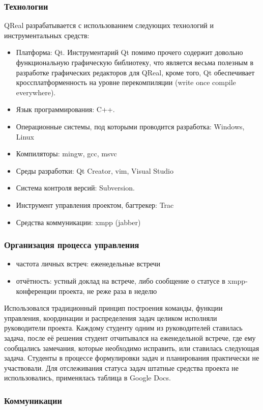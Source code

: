 \documentclass[a5paper]{article}
\begin{document}
\subsubsection{Технологии}
QReal разрабатывается с использованием следующих технологий и инструментальных средств:
\begin{itemize}
	\item Платформа: Qt. Инструментарий Qt помимо прочего содержит довольно функциональную графическую библиотеку, что является весьма полезным в разработке графических редакторов для QReal, кроме того, Qt обеспечивает кроссплатформенность на уровне перекомпиляции (write once compile everywhere).
	\item Язык программирования: C++.
	\item Операционные системы, под которыми проводится разработка: Windows, Linux
	\item Компиляторы: mingw, gcc, msvc
	\item Среды разработки: Qt Creator, vim, Visual Studio
	\item Система контроля версий: Subversion.
	\item Инструмент управления проектом, багтрекер: Trac
	\item Средства коммуникации: xmpp (jabber)
\end{itemize}

\subsubsection{Организация процесса управления}
\begin{itemize}
	\item частота личных встреч: еженедельные встречи
	\item отчётность: устный доклад на встрече, либо сообщение о статусе в xmpp-конференции проекта, не реже раза в неделю
\end{itemize}

Использовался традиционный принцип построения команды, функции управления, координации и распределения задач целиком исполняли руководители проекта. Каждому студенту одним из руководителей ставилась задача, после её решения студент отчитывался на еженедельной встрече, где ему сообщались замечания, которые необходимо исправить, или ставилась следующая задача. Студенты в процессе формулировки задач и планирования практически не участвовали. Для отслеживания статуса задач штатные средства проекта не использовались, применялась таблица в Google Docs.

\subsubsection{Коммуникации}
\end{document}
